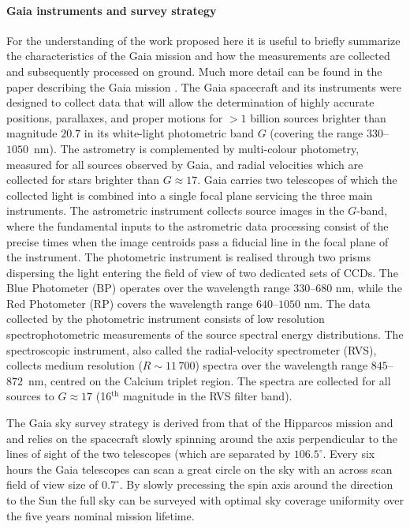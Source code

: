 \paragraph{Gaia instruments and survey strategy} For the understanding of the work proposed here it is useful to briefly summarize the characteristics of the Gaia mission and how the measurements are collected and subsequently processed on ground. Much more detail can be found in the paper describing the Gaia mission \cite{2016A&A...595A...1G}. The Gaia spacecraft and its instruments were designed to collect data that will allow the determination of highly accurate positions, parallaxes, and proper motions for $>1$ billion sources brighter than magnitude $20.7$ in its white-light photometric band $G$ (covering the range $330$--$1050$~nm). The astrometry is complemented by multi-colour photometry, measured for all sources observed by Gaia, and radial velocities which are collected for stars brighter than $G\approx17$. Gaia carries two telescopes of which the collected light is combined into a single focal plane servicing the three main instruments. The astrometric instrument collects source images in the $G$-band, where the fundamental inputs to the astrometric data processing consist of the precise times when the image centroids pass a fiducial line in the focal plane of the instrument. The photometric instrument is realised through two prisms dispersing the light entering the field of view of two dedicated sets of CCDs. The Blue Photometer (BP) operates over the wavelength range $330$--$680$ nm, while the Red Photometer (RP) covers the wavelength range $640$--$1050$ nm. The data collected by the photometric instrument consists of low resolution spectrophotometric measurements of the source spectral energy distributions. The spectroscopic instrument, also called the radial-velocity spectrometer (RVS), collects medium resolution ($R\sim11\,700$) spectra over the wavelength range $845$--$872$~nm, centred on the Calcium triplet region. The spectra are collected for all sources to $G\approx17$ (16$^\text{th}$ magnitude in the RVS filter band).

The Gaia sky survey strategy is derived from that of the Hipparcos mission and and relies on the spacecraft slowly spinning around the axis perpendicular to the lines of sight of the two telescopes (which are separated by $106.5^\circ$. Every six hours the Gaia telescopes can scan a great circle on the sky with an across scan field of view size of $0.7^\circ$. By slowly precessing the spin axis around the direction to the Sun the full sky can be surveyed with optimal sky coverage uniformity over the five years nominal mission lifetime. 

